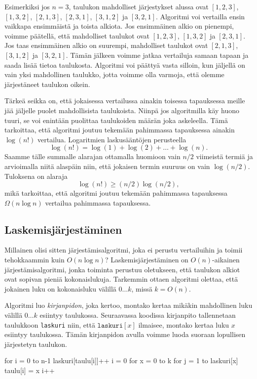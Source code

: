 Esimerkiksi jos $n=3$, taulukon mahdolliset järjestykset alussa ovat
$[1,2,3]$, $[1,3,2]$, $[2,1,3]$, $[2,3,1]$, $[3,1,2]$ ja $[3,2,1]$.
Algoritmi voi vertailla ensin vaikkapa ensimmäistä ja toista alkiota.
Jos ensimmäinen alkio on pienempi, voimme päätellä,
että mahdolliset taulukot ovat $[1,2,3]$, $[1,3,2]$ ja $[2,3,1]$.
Jos taas ensimmäinen alkio on suurempi,
mahdolliset taulukot ovat $[2,1,3]$, $[3,1,2]$ ja $[3,2,1]$.
Tämän jälkeen voimme jatkaa vertailuja samaan tapaan
ja saada lisää tietoa taulukosta.
Algoritmi voi päättyä vasta silloin, kun jäljellä on vain yksi
mahdollinen taulukko, jotta voimme olla varmoja, että olemme
järjestäneet taulukon oikein.

Tärkeä seikka on, että jokaisessa vertailussa ainakin toisessa
tapauksessa meille jää jäljelle puolet mahdollisista taulukoista.
Niinpä jos algoritmilla käy huono tuuri, se voi enintään puolittaa
taulukoiden määrän joka askeleella.
Tämä tarkoittaa, että algoritmi joutuu tekemään pahimmassa
tapauksessa ainakin $\log(n!)$ vertailua.
Logaritmien laskusääntöjen perusteella
\[
\log(n!) = \log(1)+\log(2)+\dots+\log(n).
\]
Saamme tälle summalle alarajan ottamalla huomioon vain
$n/2$ viimeistä termiä ja arvioimalla niitä alaspäin niin, 
että jokaisen termin suuruus on vain $\log(n/2)$. Tuloksena on alaraja
\[
\log(n!) \ge (n/2) \log(n/2),
\]
mikä tarkoittaa, että algoritmi joutuu tekemään
pahimmassa tapauksessa $\Omega(n \log n)$ vertailua pahimmassa tapauksessa.

\subsection{Laskemisjärjestäminen}

Millainen olisi sitten järjestämisalgoritmi,
joka ei perustu vertailuihin ja toimii
tehokkaammin kuin $O(n \log n)$?
Laskemisjärjestäminen on $O(n)$-aikainen järjestämisalgoritmi,
jonka toiminta perustuu oletukseen, että taulukon alkiot
ovat sopivan pieniä kokonaislukuja.
Tarkemmin ottaen algoritmi olettaa, että jokainen luku on
kokonaisluku välillä $0 \dots k$, missä $k=O(n)$.

Algoritmi luo \emph{kirjanpidon}, joka kertoo,
montako kertaa mikä\-kin mahdollinen luku välillä $0 \dots k$
esiintyy taulukossa.
Seuraavassa koodissa kirjanpito tallennetaan
taulukkoon \texttt{laskuri} niin, että
$\texttt{laskuri}[x]$ ilmaisee,
montako kertaa luku $x$ esiintyy taulukossa.
Tämän kirjanpidon avulla voimme luoda suoraan
lopullisen järjestetyn taulukon.

\begin{code}
for i = 0 to n-1
    laskuri[taulu[i]]++
i = 0
for x = 0 to k
    for j = 1 to laskuri[x]
        taulu[i] = x
        i++
\end{code}

